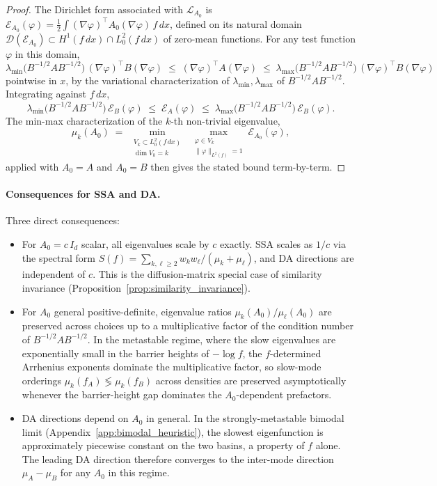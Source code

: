 \documentclass{article}
\begin{document}
\begin{proof}
The Dirichlet form associated with $\mathcal{L}_{A_0}$ is
$\mathcal{E}_{A_0}(\varphi) = \tfrac{1}{2}\int (\nabla \varphi)^\top A_0 (\nabla \varphi)\,f\,dx$,
defined on its natural domain $\mathcal{D}(\mathcal{E}_{A_0}) \subset H^1(f\,dx) \cap L^2_0(f\,dx)$ of zero-mean functions. For any test function $\varphi$ in this domain,
\[
\lambda_{\min}\!\bigl(B^{-1/2} A B^{-1/2}\bigr)\,(\nabla \varphi)^\top B (\nabla \varphi) \;\le\; (\nabla \varphi)^\top A (\nabla \varphi) \;\le\; \lambda_{\max}\!\bigl(B^{-1/2} A B^{-1/2}\bigr)\,(\nabla \varphi)^\top B (\nabla \varphi)
\]
pointwise in $x$, by the variational characterization of $\lambda_{\min}, \lambda_{\max}$ of $B^{-1/2} A B^{-1/2}$. Integrating against $f\,dx$,
\[
\lambda_{\min}\!\bigl(B^{-1/2} A B^{-1/2}\bigr)\,\mathcal{E}_B(\varphi) \;\le\; \mathcal{E}_A(\varphi) \;\le\; \lambda_{\max}\!\bigl(B^{-1/2} A B^{-1/2}\bigr)\,\mathcal{E}_B(\varphi).
\]
The min-max characterization of the $k$-th non-trivial eigenvalue,
\[
\mu_k(A_0) \;=\; \min_{\substack{V_k \subset L^2_0(f\,dx) \\ \dim V_k = k}}\;\max_{\substack{\varphi \in V_k \\ \|\varphi\|_{L^2(f)} = 1}} \mathcal{E}_{A_0}(\varphi),
\]
applied with $A_0 = A$ and $A_0 = B$ then gives the stated bound term-by-term.
\end{proof}

\paragraph{Consequences for SSA and DA.}
Three direct consequences:
\begin{itemize}[leftmargin=*,nosep]
\item For $A_0 = c\,I_d$ scalar, all eigenvalues scale by $c$ exactly. SSA scales as $1/c$ via the spectral form $S(f) = \sum_{k,\ell \ge 2} w_k w_\ell / (\mu_k + \mu_\ell)$, and DA directions are independent of $c$. This is the diffusion-matrix special case of similarity invariance (Proposition~\ref{prop:similarity_invariance}).
\item For $A_0$ general positive-definite, eigenvalue ratios $\mu_k(A_0)/\mu_\ell(A_0)$ are preserved across choices up to a multiplicative factor of the condition number of $B^{-1/2} A B^{-1/2}$. In the metastable regime, where the slow eigenvalues are exponentially small in the barrier heights of $-\log f$, the $f$-determined Arrhenius exponents dominate the multiplicative factor, so slow-mode orderings $\mu_k(f_A) \lessgtr \mu_k(f_B)$ across densities are preserved asymptotically whenever the barrier-height gap dominates the $A_0$-dependent prefactors.
\item DA directions depend on $A_0$ in general. In the strongly-metastable bimodal limit (Appendix~\ref{app:bimodal_heuristic}), the slowest eigenfunction is approximately piecewise constant on the two basins, a property of $f$ alone. The leading DA direction therefore converges to the inter-mode direction $\mu_A - \mu_B$ for any $A_0$ in this regime.
\end{itemize}
\end{document}
